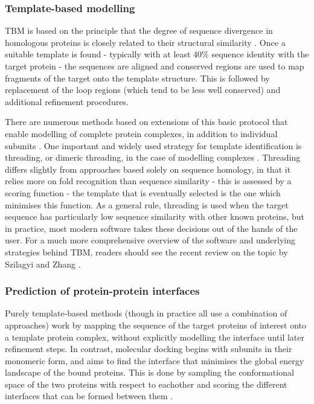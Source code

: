 \documentclass[a4paper,11pt,twoside,openright]{scrbook}
\begin{document}
\subsubsection{Template-based modelling}
TBM is based on the principle that the degree of sequence divergence in homologous proteins is closely related to their structural similarity \cite{Chothia1986}. Once a suitable template is found - typically with at least 40\% sequence identity with the target protein - the sequences are aligned and conserved regions are used to map fragments of the target onto the template structure. This is followed by replacement of the loop regions (which tend to be less well conserved) and additional refinement procedures.

There are numerous methods based on extensions of this basic protocol that enable modelling of complete protein complexes, in addition to individual subunits \cite{Chen2008,Tuncbag2011,Guerler2013}. One important and widely used strategy for template identification is threading, or dimeric threading, in the case of modelling complexes \cite{Bowie1991,Lu2002}. Threading differs slightly from approaches based solely on sequence homology, in that it relies more on fold recognition than sequence similarity - this is assessed by a scoring function - the template that is eventually selected is the one which minimises this function. As a general rule, threading is used when the target sequence has particularly low sequence similarity with other known proteins, but in practice, most modern software takes these decisions out of the hands of the user. For a much more comprehensive overview of the software and underlying strategies behind TBM, readers should see the recent review on the topic by Szilagyi and Zhang \cite{Szilagyi2014}.

\subsubsection{Prediction of protein-protein interfaces}
Purely template-based methods (though in practice all use a combination of approaches) work by mapping the sequence of the target proteins of interest onto a template protein complex, without explicitly modelling the interface until later refinement steps. In contrast, molecular docking begins with subunits in their monomeric form, and aims to find the interface that minimises the global energy landscape of the bound proteins. This is done by sampling the conformational space of the two proteins with respect to eachother and scoring the different interfaces that can be formed between them \cite{Huang2014}.
\end{document}
